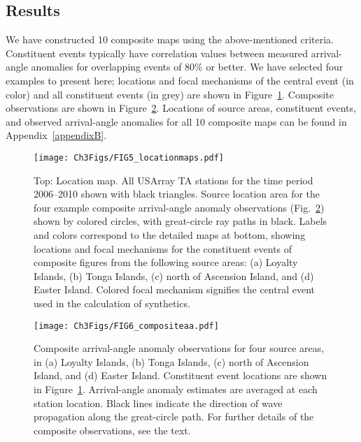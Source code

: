 \documentclass[12pt,oneside]{book}
\begin{document}
\subsection{Results}
We have constructed 10 composite maps using the above-mentioned criteria. Constituent events typically have correlation values between measured arrival-angle anomalies for overlapping events of 80\% or better. We have selected four examples to present here; locations and focal mechanisms of the central event (in color) and all constituent events (in grey) are shown in Figure~\ref{figaa:locationmap}. Composite observations are shown in Figure~\ref{figaa:composite_aa}. Locations of source areas, constituent events, and observed arrival-angle anomalies for all 10 composite maps can be found in Appendix~\ref{appendixB}.

\begin{figure} 
\begin{center}
\texttt{[image: Ch3Figs/FIG5\_locationmaps.pdf]} 
\caption[Source areas and constituent event locations and focal mechanisms for composite figures]{Top: Location map. All USArray TA stations for the time period 2006--2010 shown with black triangles. Source location area for the four example composite arrival-angle anomaly observations (Fig.~\ref{figaa:composite_aa}) shown by colored circles, with great-circle ray paths in black. Labels and colors correspond to the detailed maps at bottom, showing locations and focal mechanisms for the constituent events of composite figures from the following source areas: (a) Loyalty Islands, (b) Tonga Islands, (c) north of Ascension Island, and (d) Easter Island. Colored focal mechanism signifies the central event used in the calculation of synthetics. }
\label{figaa:locationmap}
\end{center}
\end{figure}
%
\begin{figure} 
\begin{center}
\texttt{[image: Ch3Figs/FIG6\_compositeaa.pdf]} 
\caption[Composite arrival-angle anomaly observations]{Composite arrival-angle anomaly observations for four source areas, in (a) Loyalty Islands, (b) Tonga Islands, (c) north of Ascension Island, and (d) Easter Island. Constituent event locations are shown in Figure~\ref{figaa:locationmap}. Arrival-angle anomaly estimates are averaged at each station location. Black lines indicate the direction of wave propagation along the great-circle path. For further details of the composite observations, see the text. }
\label{figaa:composite_aa}
\end{center}
\end{figure}
%
\end{document}
